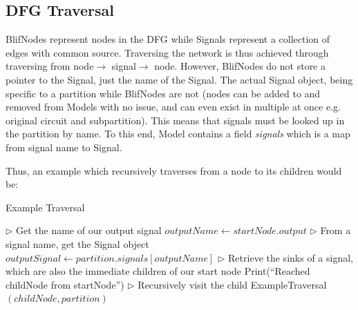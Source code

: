 \documentclass[12pt,final,oneside,a4paper]{dwThesis} %
\renewcommand\algorithmiccomment[1]{%
  \hfill$\triangleright$\ \parbox[t]{.25\linewidth}{#1}%
}
\begin{document}
   \subsection{\gls{DFG}
      Traversal} BlifNodes represent nodes in the \gls{DFG}
   while Signals represent a collection of edges with common source. Traversing
   the network is thus achieved through traversing from node$\rightarrow$
   signal$\rightarrow$ node. However, \mbox{BlifNodes} do not store a pointer to the
   Signal, just the name of the Signal. The actual Signal object, being
   specific to a partition while BlifNodes are not (nodes can be added to and
   removed from Models with no issue, and can even exist in multiple at once
   e.g. original circuit and subpartition). This means that signals must be
   looked up in the partition by name. To this end, Model contains a field \textit{signals}
    which is a map from signal name to Signal.

   Thus, an example which recursively traverses from a node to its children
   would be: 
\renewcommand\algorithmiccomment[1]{%
  \hfill$\triangleright$\ \parbox[t]{.40\linewidth}{#1}%
}
   \begin{algorithm}
      \caption{Example Traversal}\label{algExTrav}

      \begin{algorithmic}[1]
            \State $\triangleright$ Get the name of our output signal
         \State $outputName \gets startNode.output$
         \State
            \State $\triangleright$ From a signal name, get the
            Signal object
         \State $outputSignal \gets         partition.signals[outputName]$
         \State
            \State $\triangleright$ Retrieve the sinks of a signal, which are also the immediate
            children of our start node
         \State Print(``Reached childNode from startNode'')
         \State
            \State $\triangleright$ Recursively visit the child
         \State ExampleTraversal$(childNode, partition)$
          \EndFor
           \EndProcedure

      \end{algorithmic}

   \end{algorithm}
\end{document}
